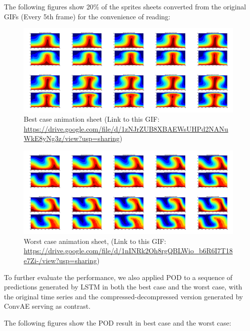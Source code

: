The following figures show 20\% of the sprites sheets converted from the original GIFs (Every 5th frame) for the convenience of reading:

\begin{figure}[H]
    \centering
    \caption{Best case animation sheet (Link to this GIF: \url{https://drive.google.com/file/d/1zNJrZUB8XBAEWsUHPd2NANuWkE8yNg3z/view?usp=sharing})}
    \includegraphics[scale=0.10]{figures/mantle_convection_images/limited_dataset/LSTM_Best_GIF_sheet.png}
\end{figure}



\begin{figure}[H]
    \centering
    \caption{Worst case animation sheet, (Link to this GIF: 
    \url{https://drive.google.com/file/d/1nINRk2Oh8rgQBLWio_b6R6I7T18e7Zi-/view?usp=sharing})}
    \includegraphics[scale=0.10]{figures/mantle_convection_images/limited_dataset/LSTM_Worst_GIF_sheet.png}
\end{figure}

To further evaluate the performance, we also applied POD to a sequence of predictions generated by LSTM in both the best case and the worst case, with the original time series and the compressed-decompressed version generated by ConvAE serving as contrast.

The following figures show the POD result in best case and the worst case:

